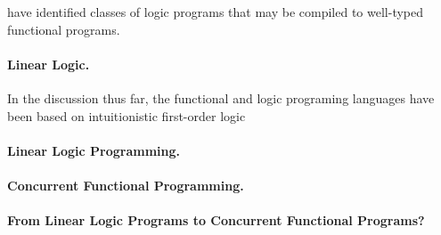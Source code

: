 \textcite{Debray+Warren:TOPLAS89}
\textcites{Felleisen:IU86}{Haynes:JLP86} have identified classes of logic programs that may be compiled to well-typed functional programs.


\paragraph*{Linear Logic.}
In the discussion thus far, the functional and logic programing languages have been based on intuitionistic first-order logic

\paragraph*{Linear Logic Programming.}


\paragraph*{Concurrent Functional Programming.}


\paragraph*{From Linear Logic Programs to Concurrent Functional Programs?}


\clearpage






